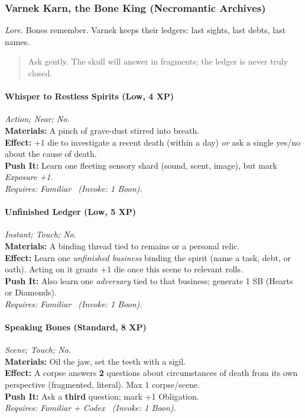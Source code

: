 
\subsubsection{Varnek Karn, the Bone King (Necromantic Archives)}
\textit{Lore.} Bones remember. Varnek keeps their ledgers: last sights, last debts, last names.

\begin{quote}
Ask gently. The skull will answer in fragments; the ledger is never truly closed.
\end{quote}

\paragraph{Whisper to Restless Spirits (Low, 4 XP)} \emph{Action; Near; No.}\\
\textbf{Materials:} A pinch of grave-dust stirred into breath.\\
\textbf{Effect:} +1 die to investigate a recent death (within a day) \emph{or} ask a single yes/no about the cause of death.\\
\textbf{Push It:} Learn one fleeting sensory shard (sound, scent, image), but mark \emph{Exposure +1}.\\
\emph{Requires: Familiar \ (\textit{Invoke:} 1 Boon).}

\paragraph{Unfinished Ledger (Low, 5 XP)} \emph{Instant; Touch; No.}\\
\textbf{Materials:} A binding thread tied to remains or a personal relic.\\
\textbf{Effect:} Learn one \emph{unfinished business} binding the spirit (name a task, debt, or oath). Acting on it grants +1 die once this scene to relevant rolls.\\
\textbf{Push It:} Also learn one \emph{adversary} tied to that business; generate 1 SB (Hearts or Diamonds).\\
\emph{Requires: Familiar \ (\textit{Invoke:} 1 Boon).}

\paragraph{Speaking Bones (Standard, 8 XP)} \emph{Scene; Touch; No.}\\
\textbf{Materials:} Oil the jaw, set the teeth with a sigil.\\
\textbf{Effect:} A corpse answers \textbf{2} questions about circumstances of death from its own perspective (fragmented, literal). Max 1 corpse/scene.\\
\textbf{Push It:} Ask a \textbf{third} question; mark +1 Obligation.\\
\emph{Requires: Familiar + Codex \ (\textit{Invoke:} 1 Boon).}

